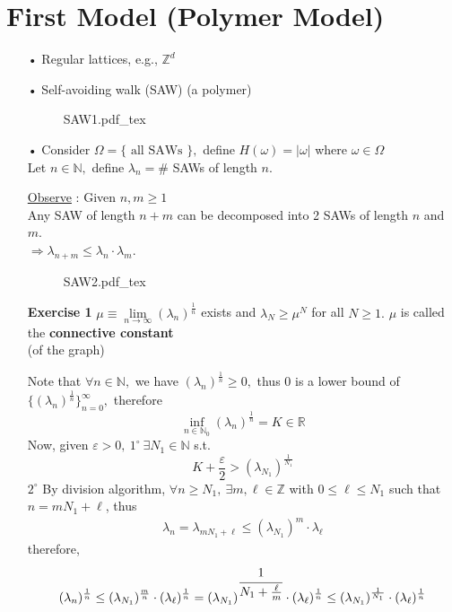 \documentclass[12pt,a4paper]{report}
\theoremstyle{definition}
\newcommand{\SOL}{\fbox{ \tt s\parbox[b][2pt][c]{6pt}{o}\hspace*{-7pt} L:}}
\newcommand{\incfig}[1]{%
{#1.pdf_tex}
}
\begin{document}
\section{First Model (Polymer Model)}
\begin{enumerate}
	\item[•] Regular lattices, e.g., $\mathbb{Z}^d$
	\item[•] Self-avoiding walk (SAW) (a polymer)
	\begin{figure}[htp]
	\centering
	\def\svgwidth{7cm}
	\incfig{SAW1}
	\end{figure}
	\item[•] Consider $\Omega=\{\mbox{ all SAWs } \},$ define $H(\omega)=|\omega|$ where $\omega\in\Omega$\\
	Let $n\in \mathbb{N},$ define $\lambda_n=\#$ SAWs of length $n.$
	\item[\underline{Observe} : ] Given $n,m\geq 1$\\
	Any SAW of length $n+m$ can be decomposed into 2 SAWs of length $n$ and $m.$\\
	$\Rightarrow \lambda_{n+m}\leq \lambda_n\cdot \lambda_m.$
	\begin{figure}[htp]
	\centering
	\def\svgwidth{7cm}
	\incfig{SAW2}
	\end{figure}
	\item[\textbf{Exercise 1}] $\mu\equiv \lim\limits_{n\to\infty}(\lambda_n)^{\frac{1}{n}}$ exists and $\lambda_N\geq \mu^N$ for all $N\geq 1.$ $\mu$ is called the \textbf{connective constant} \\[3pt](of the graph)
	\item[\SOL] Note that $\forall n\in \mathbb{N},$ we have $(\lambda_n)^{\frac{1}{n}}\geq 0,$ thus $0$ is a lower bound of $\{(\lambda_n)^{\frac{1}{n}}\}_{n=0}^\infty,$ therefore
	\[
	\inf_{n\in\mathbb{N}_0}(\lambda_n)^{\frac{1}{n}}=K\in\mathbb{R}
	\]
	Now, given $\varepsilon>0,\ 1^{\circ}\ \exists N_1\in\mathbb{N}$ s.t.
	\[
	K+\frac{\varepsilon}{2}>(\lambda_{N_1})^\frac{1}{N_1}
	\]
	$2^{\circ}$ By division algorithm, $\forall n\geq N_1,\ \exists m,\ell \in \mathbb{Z}$ with $0\leq \ell\leq N_1$ such that $n=mN_1+\ell$, thus
	\begin{align*}
	\lambda_n=\lambda_{mN_1+\ell}\leq (\lambda_{N_1})^m\cdot \lambda_\ell
	\end{align*}
	therefore,
	\begin{align*}
	(\lambda_n)^{\frac{1}{n}}&\leq (\lambda_{N_1})^{\frac{m}{n}}\cdot (\lambda_\ell)^{\frac{1}{n}}=(\lambda_{N_1})^{\cfrac{1}{N_1+\frac{\ell}{m}}}\cdot (\lambda_\ell)^\frac{1}{n}\leq (\lambda_{N_1})^\frac{1}{N_1}\cdot (\lambda_\ell)^\frac{1}{n}\\

\end{align*}
\end{enumerate}
\end{document}

